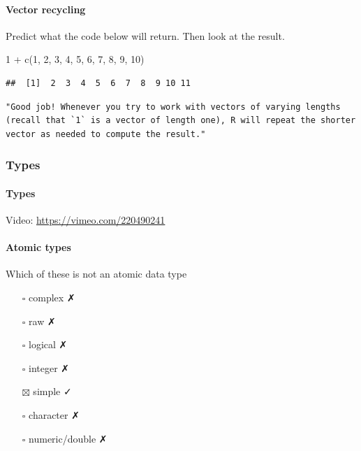 \documentclass[
]{article}
\newenvironment{Shaded}{\begin{snugshade}}{\end{snugshade}}
\newcommand{\DecValTok}[1]{\textcolor[rgb]{0.00,0.00,0.81}{#1}}
\newcommand{\FunctionTok}[1]{\textcolor[rgb]{0.00,0.00,0.00}{#1}}
\newcommand{\NormalTok}[1]{#1}
\newcommand{\SpecialCharTok}[1]{\textcolor[rgb]{0.00,0.00,0.00}{#1}}
\providecommand{\tightlist}{%
  \setlength{\itemsep}{0pt}\setlength{\parskip}{0pt}}
\begin{document}
\hypertarget{vector-recycling}{%
\paragraph{Vector recycling}\label{vector-recycling}}

Predict what the code below will return. Then look at the result.

\begin{Shaded}
\begin{Highlighting}[]
\DecValTok{1} \SpecialCharTok{+} \FunctionTok{c}\NormalTok{(}\DecValTok{1}\NormalTok{, }\DecValTok{2}\NormalTok{, }\DecValTok{3}\NormalTok{, }\DecValTok{4}\NormalTok{, }\DecValTok{5}\NormalTok{, }\DecValTok{6}\NormalTok{, }\DecValTok{7}\NormalTok{, }\DecValTok{8}\NormalTok{, }\DecValTok{9}\NormalTok{, }\DecValTok{10}\NormalTok{)}
\end{Highlighting}
\end{Shaded}

\begin{verbatim}
##  [1]  2  3  4  5  6  7  8  9 10 11
\end{verbatim}

\begin{verbatim}
"Good job! Whenever you try to work with vectors of varying lengths (recall that `1` is a vector of length one), R will repeat the shorter vector as needed to compute the result."
\end{verbatim}

\hypertarget{types}{%
\subsubsection{Types}\label{types}}

\hypertarget{types-1}{%
\paragraph{Types}\label{types-1}}

Video: \url{https://vimeo.com/220490241}

\hypertarget{atomic-types}{%
\paragraph{Atomic types}\label{atomic-types}}

Which of these is not an atomic data type

\begin{itemize}
\tightlist
\item[$\square$]
  complex ✗
\item[$\square$]
  raw ✗
\item[$\square$]
  logical ✗
\item[$\square$]
  integer ✗
\item[$\boxtimes$]
  simple ✓
\item[$\square$]
  character ✗
\item[$\square$]
  numeric/double ✗
\end{itemize}
\end{document}
